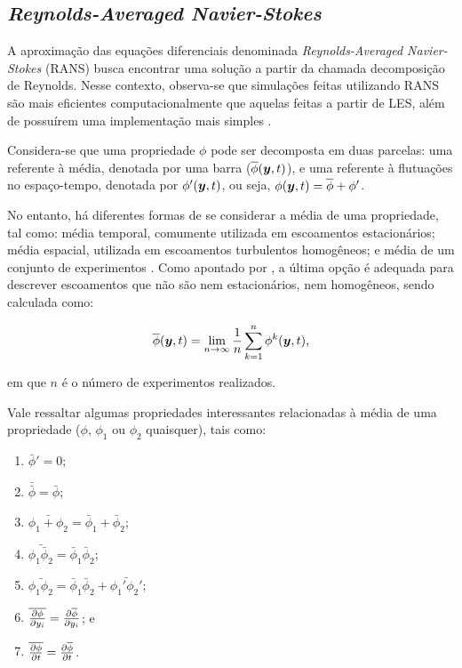 \subsection{\textit{Reynolds-Averaged Navier-Stokes}} \label{RANS}

A aproximação das equações diferenciais denominada \textit{Reynolds-Averaged Navier-Stokes} (RANS) busca encontrar uma solução a partir da chamada decomposição de Reynolds. Nesse contexto, observa-se que simulações feitas utilizando RANS são mais eficientes computacionalmente que aquelas feitas a partir de LES, além de possuírem uma implementação mais simples \cite{alfonsi2009reynolds, ling2015evaluation}.

Considera-se que uma propriedade $\phi$ pode ser decomposta em duas parcelas: uma referente à média, denotada por uma barra ($\overline{\phi}(\boldsymbol{y},t)$), e uma referente à flutuações no espaço-tempo, denotada por $\phi'(\boldsymbol{y},t)$, ou seja, $\phi(\boldsymbol{y},t)=\overline{\phi}+\phi'$.

No entanto, há diferentes formas de se considerar a média de uma propriedade, tal como: média temporal, comumente utilizada em escoamentos estacionários; média espacial, utilizada em escoamentos turbulentos homogêneos; e média de um conjunto de experimentos \cite{tennekes1972first,speziale1991analytical,alfonsi2009reynolds}. Como apontado por , a última opção é adequada para descrever escoamentos que não são nem estacionários, nem homogêneos, sendo calculada como:

\begin{equation}
    \overline{\phi}(\boldsymbol{y},t)=\lim_{n\to\infty}{\frac{1}{n}\sum_{k=1}^n{\phi^{k}(\boldsymbol{y},t)}}\text{,}
\end{equation}

\noindent em que $n$ é o número de experimentos realizados.

Vale ressaltar algumas propriedades interessantes relacionadas à média de uma propriedade ($\phi$, $\phi_1$ ou $\phi_2$ quaisquer), tais como:

\begin{enumerate}[label=\alph*.]
    \item $\bar{\phi}'=0$;
    \item $\bar{\bar{\phi}}=\bar{\phi}$;
    \item $\bar{\phi_1+\phi_2}=\bar{\phi}_1+\bar{\phi}_2$;
    \item $\bar{\phi_1\bar{\phi}_2}=\bar{\phi}_1\bar{\phi}_2$;
    \item $\bar{\phi_1\phi_2}=\bar{\phi}_1\bar{\phi}_2+\bar{\phi_1'\phi_2'}$;
    \item $\overline{\frac{\partial{\phi}}{\partial{y_i}}}=\frac{\partial{\overline{\phi}}}{\partial{y_i}}$; e
    \item $\overline{\frac{\partial{\phi}}{\partial{t}}}=\frac{\partial{\overline{\phi}}}{\partial{t}}$.
\end{enumerate}

